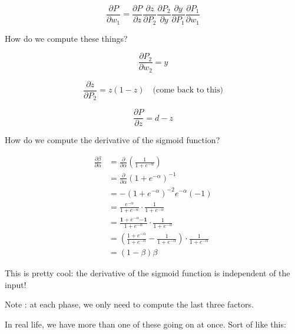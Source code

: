 \begin{displaymath}
  \frac{\partial P}{\partial w_1}
  =
  \frac{\partial P}{\partial z}
  \frac{\partial z}{\partial P_2}
  \frac{\partial P_2}{\partial y}
  \frac{\partial y}{\partial P_1}
  \frac{\partial P_1}{\partial w_1}
\end{displaymath}

How do we compute these things?

\begin{displaymath}
  \frac{\partial P_2}{\partial w_2} = y
\end{displaymath}

\begin{displaymath}
  \frac{\partial z}{\partial P_2} = z(1-z) \quad \mbox{(come back to this)}
\end{displaymath}

\begin{displaymath}
  \frac{\partial P}{\partial z} = d-z
\end{displaymath}

How do we compute the derivative of the sigmoid function?


\begin{align*}
  \frac{\partial\beta}{\partial\alpha}
  & = \frac{\partial}{\partial\alpha} \left( \frac{1}{1+e^{-\alpha}} \right) \\[3mm]
  & = \frac{\partial}{\partial\alpha} \left(1+e^{-\alpha}\right)^{-1} \\[3mm]
  & = -\left(1+e^{-\alpha}\right)^{-2} e^{-\alpha} (-1) \\[3mm]
  & = \frac{e^{-\alpha}}{1+e^{-\alpha}} \cdot \frac{1}{1+e^{-\alpha}} \\[3mm]
  & = \frac{\mathbf{1+} e^{-\alpha} \mathbf{-1}}{1+e^{-\alpha}} \cdot \frac{1}{1+e^{-\alpha}} \\[3mm]
  & = \left(\frac{1+e^{-\alpha}}{1+e^{-\alpha}} - \frac{1}{1+e^{-\alpha}}\right)
    \cdot \frac{1}{1+e^{-\alpha}} \\[3mm]
  & = (1-\beta)\beta
\end{align*}

This is pretty cool: the derivative of the sigmoid function is independent of the input!

Note : at each phase, we only need to compute the last three factors.



In real life, we have more than one of these going on at once.  Sort of like this:

